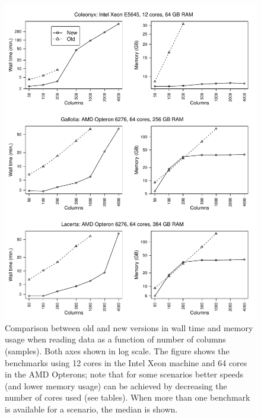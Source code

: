 \documentclass[a4paper,11pt]{article}
\begin{document}
\clearpage
\begin{figure}[h!]
\begin{center}
  \includegraphics[width=16.1cm,keepaspectratio]{reading-benchmark-fig.pdf}
\end{center}
\caption[Wall time and memory usage when reading data: version
comparison]{\label{fig-read} Comparison between old and new versions in
  wall time and memory usage when reading data as a function of number of
  columns (samples). Both axes shown in log scale. The figure shows the
  benchmarks using 12 cores in the Intel Xeon machine and 64 cores in the
  AMD Opterons; note that for some scenarios better speeds (and lower
  memory usage) can be achieved by decreasing the number of cores used
  (see tables). When more than one benchmark is available for a scenario,
  the median is shown.}

\end{figure}

\begin{center}

\clearpage

\clearpage

\end{center}
\end{document}
